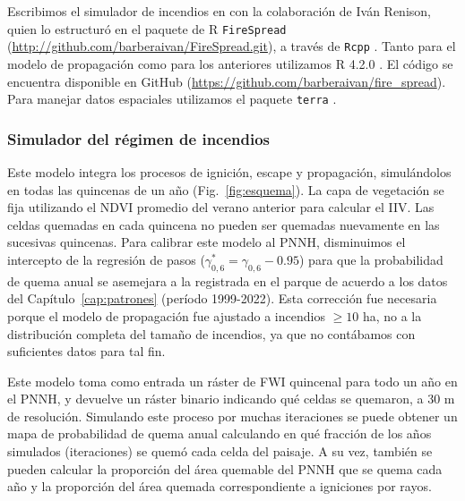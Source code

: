 Escribimos el simulador de incendios en \cpp con la colaboración de Iván Renison, quien lo estructuró en el paquete de R \texttt{FireSpread} (\url{http://github.com/barberaivan/FireSpread.git}), a través de \texttt{Rcpp} \citep{Rcpp}. Tanto para el modelo de propagación como para los anteriores utilizamos R 4.2.0 \citep{R}. El código se encuentra disponible en GitHub (\url{https://github.com/barberaivan/fire_spread}). Para manejar datos espaciales utilizamos el paquete \texttt{terra} \citep{terra}.

\subsubsection{Simulador del régimen de incendios}



Este modelo integra los procesos de ignición, escape y propagación, simulándolos en todas las quincenas de un año (Fig.~\ref{fig:esquema}). La capa de vegetación se fija utilizando el NDVI promedio del verano anterior para calcular el IIV. Las celdas quemadas en cada quincena no pueden ser quemadas nuevamente en las sucesivas quincenas. Para calibrar este modelo al PNNH, disminuimos el intercepto de la regresión de pasos ($\gamma_{0,6}^* = \gamma_{0,6} - 0.95$) para que la probabilidad de quema anual se asemejara a la registrada en el parque de acuerdo a los datos del Capítulo~\ref{cap:patrones} (período 1999-2022). Esta corrección fue necesaria porque el modelo de propagación fue ajustado a incendios $\ge 10$ ha, no a la distribución completa del tamaño de incendios, ya que no contábamos con suficientes datos para tal fin. 

Este modelo toma como entrada un ráster de FWI quincenal para todo un año en el PNNH, y devuelve un ráster binario indicando qué celdas se quemaron, a 30 m de resolución. Simulando este proceso por muchas iteraciones se puede obtener un mapa de probabilidad de quema anual calculando en qué fracción de los años simulados (iteraciones) se quemó cada celda del paisaje. A su vez, también se pueden calcular la proporción del área quemable del PNNH que se quema cada año y la proporción del área quemada correspondiente a igniciones por rayos.


